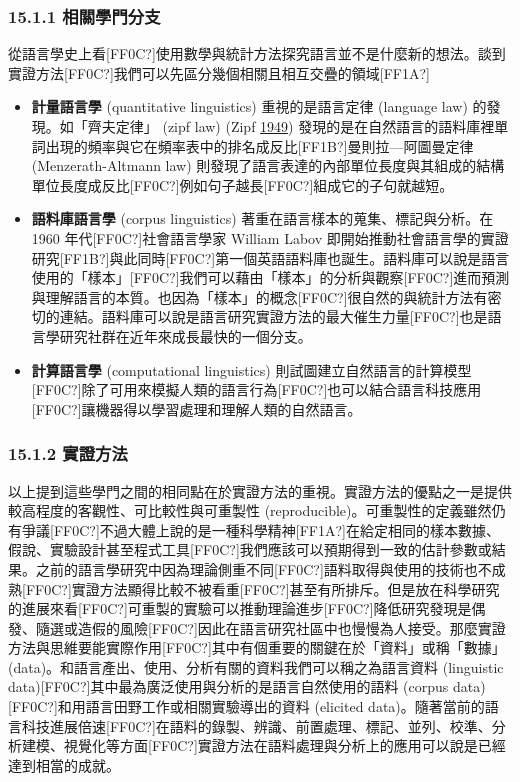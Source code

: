 \subsubsection{15.1.1 相關學門分支}

從語言學史上看[FF0C?]使用數學與統計方法探究語言並不是什麼新的想法。談到實證方法[FF0C?]我們可以先區分幾個相關且相互交疊的領域[FF1A?]

\begin{itemize}
\item \textbf{計量語言學} (quantitative linguistics) 重視的是語言定律 (language law) 的發現。如「齊夫定律」 (zipf law) (Zipf \hyperlink{bookmarkid2lwamvv}{1949}) 發現的是在自然語言的語料庫裡單詞出現的頻率與它在頻率表中的排名成反比[FF1B?]曼則拉—阿圖曼定律 (Menzerath-Altmann law) 則發現了語言表達的內部單位長度與其組成的結構單位長度成反比[FF0C?]例如句子越長[FF0C?]組成它的子句就越短。

\item \textbf{語料庫語言學} (corpus linguistics) 著重在語言樣本的蒐集、標記與分析。在 1960 年代[FF0C?]社會語言學家 William Labov 即開始推動社會語言學的實證研究[FF1B?]與此同時[FF0C?]第一個英語語料庫也誕生。語料庫可以說是語言使用的「樣本」[FF0C?]我們可以藉由「樣本」的分析與觀察[FF0C?]進而預測與理解語言的本質。也因為「樣本」的概念[FF0C?]很自然的與統計方法有密切的連結。語料庫可以說是語言研究實證方法的最大催生力量[FF0C?]也是語言學研究社群在近年來成長最快的一個分支。

\item \textbf{計算語言學} (computational linguistics) 則試圖建立自然語言的計算模型[FF0C?]除了可用來模擬人類的語言行為[FF0C?]也可以結合語言科技應用[FF0C?]讓機器得以學習處理和理解人類的自然語言。

\end{itemize}
\subsubsection{15.1.2 實證方法}

以上提到這些學門之間的相同點在於實證方法的重視。實證方法的優點之一是提供較高程度的客觀性、可比較性與可重製性 (reproducible)。可重製性的定義雖然仍有爭議[FF0C?]不過大體上說的是一種科學精神[FF1A?]在給定相同的樣本數據、假說、實驗設計甚至程式工具[FF0C?]我們應該可以預期得到一致的估計參數或結果。之前的語言學研究中因為理論側重不同[FF0C?]語料取得與使用的技術也不成熟[FF0C?]實證方法顯得比較不被看重[FF0C?]甚至有所排斥。但是放在科學研究的進展來看[FF0C?]可重製的實驗可以推動理論進步[FF0C?]降低研究發現是偶發、隨選或造假的風險[FF0C?]因此在語言研究社區中也慢慢為人接受。那麼實證方法與思維要能實際作用[FF0C?]其中有個重要的關鍵在於「資料」或稱「數據」(data)。和語言產出、使用、分析有關的資料我們可以稱之為語言資料 (linguistic data)[FF0C?]其中最為廣泛使用與分析的是語言自然使用的語料 (corpus data)[FF0C?]和用語言田野工作或相關實驗導出的資料 (elicited data)。隨著當前的語言科技進展倍速[FF0C?]在語料的錄製、辨識、前置處理、標記、並列、校準、分析建模、視覺化等方面[FF0C?]實證方法在語料處理與分析上的應用可以說是已經達到相當的成就。

